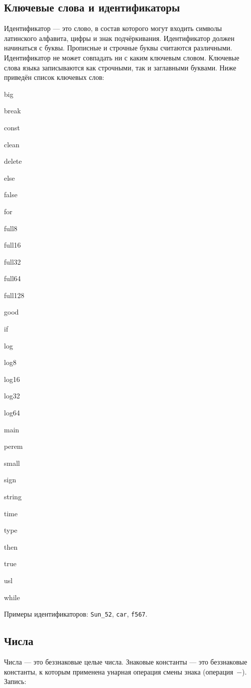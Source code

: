 \documentclass[10pt]{report}
\newcounter{rem}[section]
\begin{document}
        \subsection{Ключевые слова и идентификаторы}
Идентификатор --- это слово, в состав которого могут входить символы латинского алфавита, цифры и знак подчёркивания. Идентификатор должен начинаться с буквы.
Прописные и строчные буквы считаются различными. Идентификатор не может совпадать ни с каким ключевым словом. Ключевые слова языка записываются как строчными, так и заглавными буквами. Ниже приведён список ключевых слов:        
\begin{multicols}{3}
\bf


big

break

const

clean

delete

else

false

for

full8

full16

full32

full64

full128

good

if

log

log8

log16

log32

log64

main

perem

small

sign

string

time

type

then

true

usl

while


\end{multicols}

Примеры идентификаторов: \texttt{Sun_52}, \texttt{car}, \texttt{f567}.   

    
        \subsection{Числа}
Числа --- это беззнаковые целые числа. Знаковые константы --- это беззнаковые константы, к которым применена унарная операция смены знака (операция\ \glqq$-$\grqq). Запись:
\end{document}
